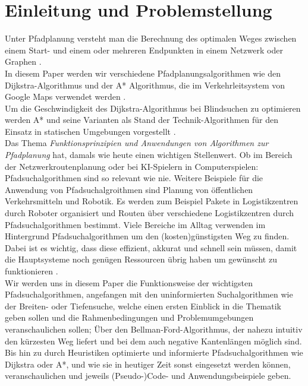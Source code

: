 
\chapter{Einleitung und Problemstellung}
\label{Einleitung und Problemstellung}

Unter Pfadplanung versteht man die Berechnung des optimalen Weges zwischen einem Start- und einem oder mehreren Endpunkten in einem Netzwerk oder Graphen \cite{Esri:00}. \\
In diesem Paper werden wir verschiedene Pfadplanungsalgorithmen wie den Dijkstra-Algorithmus und der A* Algorithmus, 
die im Verkehrleitsystem von Google Maps verwendet werden \cite{Mehta:19}. 
\noindent \\
Um die Geschwindigkeit des Dijkstra-Algorithmus bei Blindsuchen zu optimieren werden A* und seine Varianten als Stand der Technik-Algorithmen 
für den Einsatz in statischen Umgebungen vorgestellt \cite{Karur:21}.
\noindent \\
Das Thema \emph{Funktionsprinzipien und Anwendungen von Algorithmen zur Pfadplanung} hat, damals wie heute einen wichtigen Stellenwert. 
Ob im Bereich der Netzwerkroutenplanung oder bei KI-Spielern in Computerspielen: Pfadsuchalgorithmen sind so relevant wie nie. 
Weitere Beispiele für die Anwendung von Pfadsuchalgroithmen sind Planung von öffentlichen Verkehrsmitteln und 
Robotik. Es werden zum Beispiel Pakete in Logistikzentren durch Roboter organisiert und Routen über verschiedene Logistikzentren durch Pfadsuchalgorithmen bestimmt.
Viele Bereiche im Alltag verwenden im Hintergrund Pfadsuchalgorithmen um den (kosten)günstigsten Weg zu finden. Dabei ist es wichtig, 
dass diese effizient, akkurat und schnell sein müssen, damit die Hauptsysteme noch genügen Ressourcen übrig haben um gewünscht zu funktionieren \cite{Foeada:21}. 
\noindent \\
Wir werden uns in diesem Paper die Funktionsweise der wichtigsten Pfadsuchalgorithmen, angefangen mit den uninformierten Suchalgorithmen wie der Breiten- oder Tiefensuche, 
welche einen ersten Einblick in die Thematik geben sollen und die Rahmenbedingungen und Problemumgebungen veranschaulichen sollen; 
Über den Bellman-Ford-Algorithmus, der nahezu intuitiv den kürzesten Weg liefert und bei dem auch negative Kantenlängen möglich sind\cite{Mukhlif:20}. 
Bis hin zu durch Heuristiken optimierte und informierte Pfadsuchalgorithmen wie Dijkstra oder A*, und wie sie in heutiger Zeit 
sonst eingesetzt werden können, veranschaulichen und jeweils (Pseudo-)Code- und Anwendungsbeispiele geben\cite{Russell:10a}.
